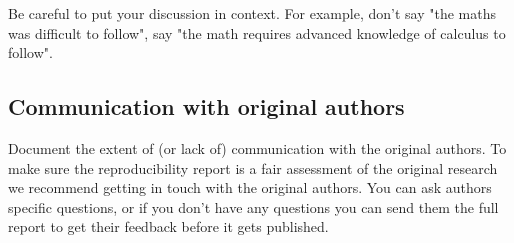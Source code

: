 Be careful to put your discussion in context. For example, don't say "the maths was difficult to follow", say "the math requires advanced knowledge of calculus to follow". 

\subsection{Communication with original authors}
Document the extent of (or lack of) communication with the original authors. To make sure the reproducibility report is a fair assessment of the original research we recommend getting in touch with the original authors. You can ask authors specific questions, or if you don't have any questions you can send them the full report to get their feedback before it gets published. 
